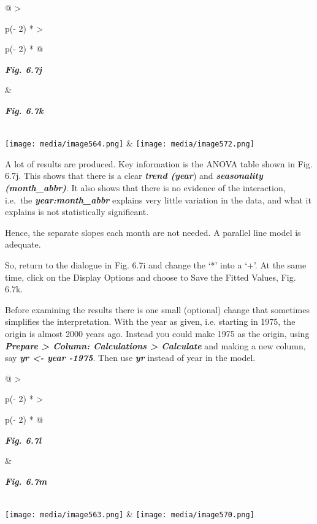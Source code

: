 \documentclass[
  letterpaper,
  DIV=11,
  numbers=noendperiod]{scrreprt}
\begin{document}
\begin{longtable}[]{@{}
  >{\raggedright\arraybackslash}p{(\columnwidth - 2\tabcolsep) * }
  >{\raggedright\arraybackslash}p{(\columnwidth - 2\tabcolsep) * }@{}}
\toprule\noalign{}
\begin{minipage}[b]{\linewidth}\raggedright
\textbf{\emph{Fig. 6.7j}}
\end{minipage} & \begin{minipage}[b]{\linewidth}\raggedright
\textbf{\emph{Fig. 6.7k}}
\end{minipage} \\
\midrule\noalign{}
\endhead
\bottomrule\noalign{}
\endlastfoot
\texttt{[image: media/image564.png]} &
\texttt{[image: media/image572.png]} \\
\end{longtable}

A lot of results are produced. Key information is the ANOVA table shown
in Fig. 6.7j. This shows that there is a clear \textbf{\emph{trend
(year}}) and \textbf{\emph{seasonality (month\_abbr)}}. It also shows
that there is no evidence of the interaction, i.e.~the
\textbf{\emph{year:month\_abbr}} explains very little variation in the
data, and what it explains is not statistically significant.

Hence, the separate slopes each month are not needed. A parallel line
model is adequate.

So, return to the dialogue in Fig. 6.7i and change the `*' into a `+'.
At the same time, click on the Display Options and choose to Save the
Fitted Values, Fig. 6.7k.

Before examining the results there is one small (optional) change that
sometimes simplifies the interpretation. With the year as given, i.e.
starting in 1975, the origin is almost 2000 years ago. Instead you could
make 1975 as the origin, using \textbf{\emph{Prepare \textgreater{}
Column: Calculations \textgreater{} Calculate}} and making a new column,
say \textbf{\emph{yr \textless- year -1975}}. Then use
\textbf{\emph{yr}} instead of year in the model.

\begin{longtable}[]{@{}
  >{\raggedright\arraybackslash}p{(\columnwidth - 2\tabcolsep) * }
  >{\raggedright\arraybackslash}p{(\columnwidth - 2\tabcolsep) * }@{}}
\toprule\noalign{}
\begin{minipage}[b]{\linewidth}\raggedright
\textbf{\emph{Fig. 6.7l}}
\end{minipage} & \begin{minipage}[b]{\linewidth}\raggedright
\textbf{\emph{Fig. 6.7m}}
\end{minipage} \\
\midrule\noalign{}
\endhead
\bottomrule\noalign{}
\endlastfoot
\texttt{[image: media/image563.png]} &
\texttt{[image: media/image570.png]} \\
\end{longtable}
\end{document}

